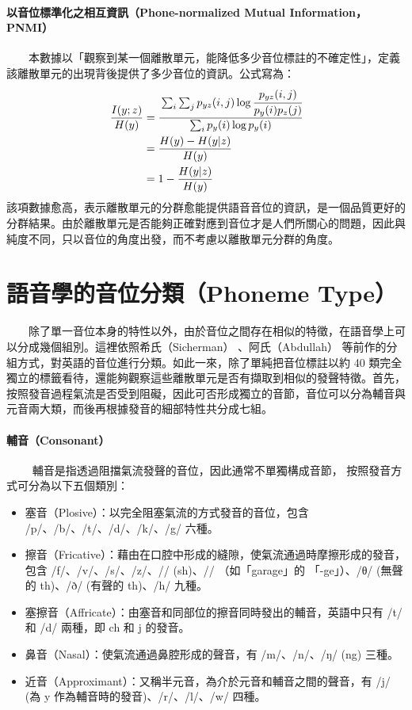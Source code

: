 \paragraph{以音位標準化之相互資訊（Phone-normalized Mutual Information，PNMI）}\hfill \break
%
　　本數據以「觀察到某一個離散單元，能降低多少音位標註的不確定性」，定義該離散單元的出現背後提供了多少音位的資訊。公式寫為：
\begin{align}
    \frac{I(y;z)}{H(y)} & =\cfrac{\sum_i \sum_j p_{yz}(i, j) \log \cfrac{p_{yz}(i, j)}{p_y(i)p_z(j)}}{\sum_i p_y(i) \log p_y(i)} \\
                        & =\frac{H(y)-H(y|z)}{H(y)}                                                                              \\
                        & =1-\frac{H(y|z)}{H(y)}
\end{align}
        該項數據愈高，表示離散單元的分群愈能提供語音音位的資訊，是一個品質更好的分群結果。由於離散單元是否能夠正確對應到音位才是人們所關心的問題，因此與純度不同，只以音位的角度出發，而不考慮以離散單元分群的角度。

\section{語音學的音位分類（Phoneme Type）}  %

　　除了單一音位本身的特性以外，由於音位之間存在相似的特徵，在語音學上可以分成幾個組別。這裡依照希氏（Sicherman） \cite{10097097}、阿氏（Abdullah）\cite{abdullah23_interspeech} 等前作的分組方式，對英語的音位進行分類。如此一來，除了單純把音位標註以約 40 類完全獨立的標籤看待，還能夠觀察這些離散單元是否有擷取到相似的發聲特徵。首先，按照發音過程氣流是否受到阻礙，因此可否形成獨立的音節，音位可以分為輔音與元音兩大類，而後再根據發音的細部特性共分成七組。

\paragraph{輔音（Consonant）} \hfill \break
　　
        輔音是指透過阻擋氣流發聲的音位，因此通常不單獨構成音節，
按照發音方式可分為以下五個類別：
        
        \begin{itemize}
            \item 塞音（Plosive）：以完全阻塞氣流的方式發音的音位，包含 /p/、/b/、/t/、/d/、/k/、/g/ 六種。
            \item 擦音（Fricative）：藉由在口腔中形成的縫隙，使氣流通過時摩擦形成的發音，包含 /f/、/v/、/s/、/z/、/\textesh/ (sh)、/\textyogh/ （如「garage」的 「-ge」）、/θ/ (無聲的 th)、/ð/ (有聲的 th)、/h/ 九種。
            \item 塞擦音（Affricate）：由塞音和同部位的擦音同時發出的輔音，英語中只有 /t\textesh/ 和 /d\textyogh/ 兩種，即 ch 和 j 的發音。
            \item 鼻音（Nasal）：使氣流通過鼻腔形成的聲音，有 /m/、/n/、/ŋ/ (ng) 三種。
            \item 近音（Approximant）：又稱半元音，為介於元音和輔音之間的聲音，有 /j/ (為 y 作為輔音時的發音)、/r/、/l/、/w/ 四種。
        \end{itemize}

